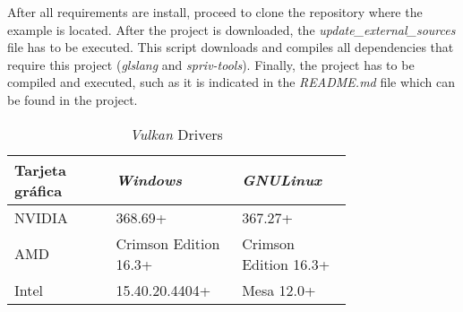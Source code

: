 After all requirements are install, proceed to clone the repository where the example is located. After the project
is downloaded, the \emph{update\_external\_sources} file has to be executed. This script downloads and compiles
all dependencies that require this project (\emph{glslang} and \emph{spriv-tools}). Finally, the project has to be
compiled and executed, such as it is indicated in the \emph{README.md} file which can be found in the project.

\begin{table*}[t]
  \centering
  \begin{tabular}{p{0.25\linewidth}p{0.25\linewidth}p{0.25\linewidth}}
    \toprule
    Tarjeta gráfica & \emph{Windows}    & \emph{GNU\/Linux} \\
    \midrule
    NVIDIA          & 368.69+                   & 367.27+ \\
    AMD             & Crimson Edition 16.3+     & Crimson Edition 16.3+ \\
    Intel           & 15.40.20.4404+            & Mesa 12.0+ \\
    \bottomrule
  \end{tabular}
  \caption{\emph{Vulkan} Drivers}
  \label{tab:vulkan_drivers}
\end{table*}

